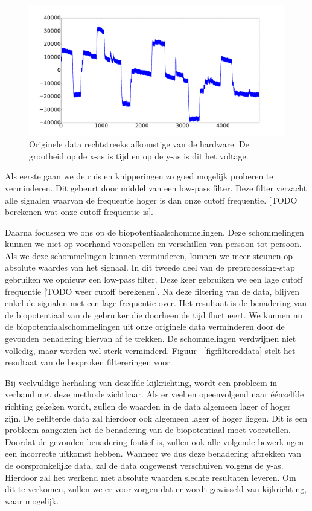 \documentclass{article}
\begin{document}
\begin{figure}[h]
\centering
\includegraphics[width=\linewidth]{images/original_data}
\caption{Originele data rechtstreeks afkomstige van de hardware. De grootheid op de x-as is tijd en op de y-as is dit het voltage.}
\label{fig:originaldata}
\end{figure}

Als eerste gaan we de ruis en knipperingen zo goed mogelijk proberen te verminderen. Dit gebeurt door middel van een low-pass filter. Deze filter verzacht alle signalen waarvan de frequentie hoger is dan onze cutoff frequentie. [TODO berekenen wat onze cutoff frequentie is].

Daarna focussen we ons op de biopotentiaalschommelingen. Deze schommelingen kunnen we niet op voorhand voorspellen en verschillen van persoon tot persoon. Als we deze schommelingen kunnen verminderen, kunnen we meer steunen op absolute waardes van het signaal. In dit tweede deel van de preprocessing-stap gebruiken we opnieuw een low-pass filter. Deze keer gebruiken we een lage cutoff frequentie [TODO weer cutoff berekenen]. Na deze filtering van de data, blijven enkel de signalen met een lage frequentie over. Het resultaat is de benadering van de biopotentiaal van de gebruiker die doorheen de tijd fluctueert. We kunnen nu de biopotentiaalschommelingen uit onze originele data verminderen door de gevonden benadering hiervan af te trekken. De schommelingen verdwijnen niet volledig, maar worden wel sterk verminderd. Figuur ~\ref{fig:filtereddata} stelt het resultaat van de besproken filtereringen voor.

Bij veelvuldige herhaling van dezelfde kijkrichting, wordt een probleem in verband met deze methode zichtbaar. Als er veel en opeenvolgend naar éénzelfde richting gekeken wordt, zullen de waarden in de data algemeen lager of hoger zijn. De gefilterde data zal hierdoor ook algemeen lager of hoger liggen. Dit is een probleem aangezien het de benadering van de biopotentiaal moet voorstellen. Doordat de gevonden benadering foutief is, zullen ook alle volgende bewerkingen een incorrecte uitkomst hebben. Wanneer we dus deze benadering aftrekken van de oorspronkelijke data, zal de data ongewenst verschuiven volgens de y-as. Hierdoor zal het werkend met absolute waarden slechte resultaten leveren. Om dit te verkomen, zullen we er voor zorgen dat er wordt gewisseld van kijkrichting, waar mogelijk.
\end{document}
